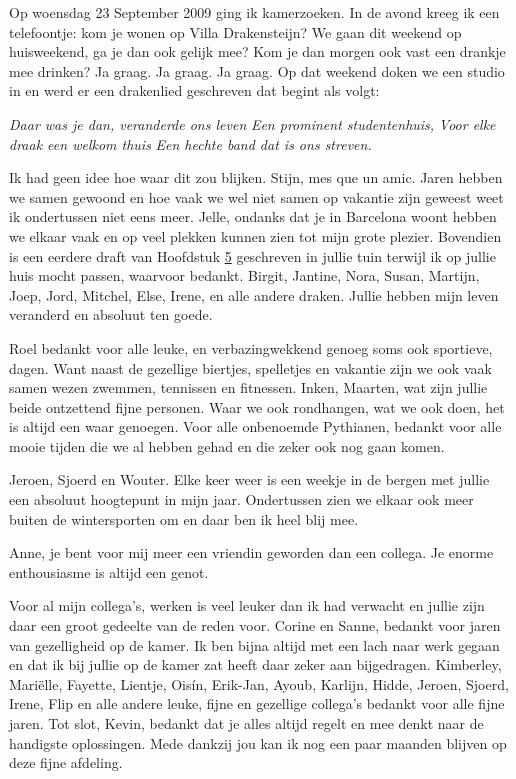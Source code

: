 \documentclass[openright,titlepage,12pt,a4paper]{book}
\begin{document}
\newpage

Op woensdag 23 September 2009 ging ik kamerzoeken. In de avond kreeg ik een telefoontje: kom je wonen op Villa Drakensteijn? We gaan dit weekend op huisweekend, ga je dan ook gelijk mee? Kom je dan morgen ook vast een drankje mee drinken? Ja graag. Ja graag. Ja graag. Op dat weekend doken we een studio in en werd er een drakenlied geschreven dat begint als volgt:

\emph{Daar was je dan, veranderde ons leven} \newline
\emph{Een prominent studentenhuis,} \newline
\emph{Voor elke draak een welkom thuis} \newline
\emph{Een hechte band dat is ons streven.}

Ik had geen idee hoe waar dit zou blijken. Stijn, mes que un amic. Jaren hebben we samen gewoond en hoe vaak we wel niet samen op vakantie zijn geweest weet ik ondertussen niet eens meer. Jelle, ondanks dat je in Barcelona woont hebben we elkaar vaak en op veel plekken kunnen zien tot mijn grote plezier. Bovendien is een eerdere draft van Hoofdstuk \protect\hyperlink{Burns}{5} geschreven in jullie tuin terwijl ik op jullie huis mocht passen, waarvoor bedankt. Birgit, Jantine, Nora, Susan, Martijn, Joep, Jord, Mitchel, Else, Irene, en alle andere draken. Jullie hebben mijn leven veranderd en absoluut ten goede.

Roel bedankt voor alle leuke, en verbazingwekkend genoeg soms ook sportieve, dagen. Want naast de gezellige biertjes, spelletjes en vakantie zijn we ook vaak samen wezen zwemmen, tennissen en fitnessen. Inken, Maarten, wat zijn jullie beide ontzettend fijne personen. Waar we ook rondhangen, wat we ook doen, het is altijd een waar genoegen. Voor alle onbenoemde Pythianen, bedankt voor alle mooie tijden die we al hebben gehad en die zeker ook nog gaan komen.

Jeroen, Sjoerd en Wouter. Elke keer weer is een weekje in de bergen met jullie een absoluut hoogtepunt in mijn jaar. Ondertussen zien we elkaar ook meer buiten de wintersporten om en daar ben ik heel blij mee.

Anne, je bent voor mij meer een vriendin geworden dan een collega. Je enorme enthousiasme is altijd een genot.

Voor al mijn collega's, werken is veel leuker dan ik had verwacht en jullie zijn daar een groot gedeelte van de reden voor. Corine en Sanne, bedankt voor jaren van gezelligheid op de kamer. Ik ben bijna altijd met een lach naar werk gegaan en dat ik bij jullie op de kamer zat heeft daar zeker aan bijgedragen. Kimberley, Mariëlle, Fayette, Lientje, Oisín, Erik-Jan, Ayoub, Karlijn, Hidde, Jeroen, Sjoerd, Irene, Flip en alle andere leuke, fijne en gezellige collega's bedankt voor alle fijne jaren. Tot slot, Kevin, bedankt dat je alles altijd regelt en mee denkt naar de handigste oplossingen. Mede dankzij jou kan ik nog een paar maanden blijven op deze fijne afdeling.
\end{document}
